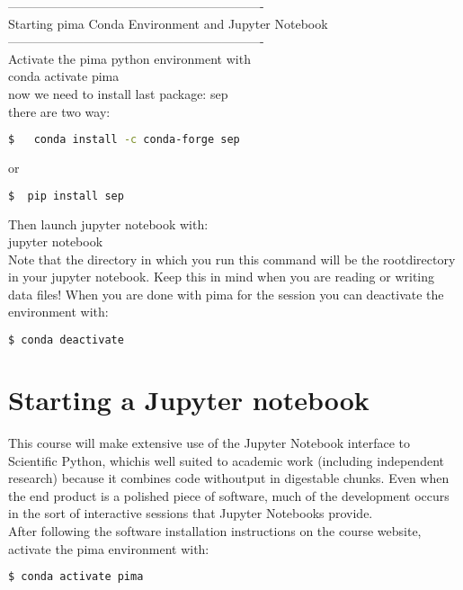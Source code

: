 \documentclass[11pt]{book}
\begin{document}
------------------------------------------------------------- \\
Starting pima Conda Environment and Jupyter Notebook \\
------------------------------------------------------------- \\
Activate the pima python environment with  \\
conda activate pima  \\

now we need to install last package: sep \\
there are two way: \\
\begin{lstlisting}[language=bash]
$   conda install -c conda-forge sep 
\end{lstlisting}
or \\
\begin{lstlisting}[language=bash]
$  pip install sep
\end{lstlisting}

Then launch jupyter notebook with: \\
jupyter notebook \\
Note that the directory in which you run this command will be the rootdirectory in your jupyter notebook.  Keep this in mind when you are reading or writing data files!
When you are done with pima for the session you can deactivate the environment with: 
\begin{lstlisting}[language=bash]
 $ conda deactivate 
\end{lstlisting}



\newpage

\section{Starting a Jupyter notebook}
This course will make extensive use of the Jupyter Notebook interface to Scientific Python, whichis  well  suited  to  academic  work  (including  independent  research)  because  it  combines  code  withoutput in digestable chunks.  Even when the end product is a polished piece of software, much of the development occurs in the sort of interactive sessions that Jupyter Notebooks provide.\\

After following the software installation instructions on the course website, activate the pima environment with:

\begin{lstlisting}[language=bash]
  $ conda activate pima
\end{lstlisting}
\end{document}
